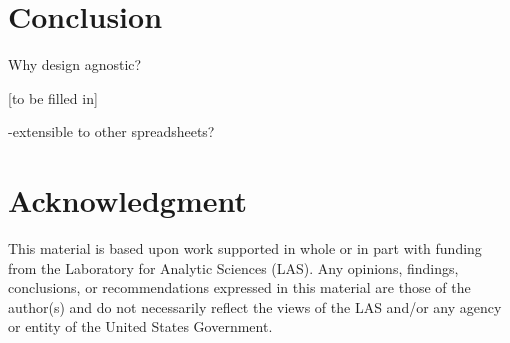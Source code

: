 \documentclass[conference]{IEEEtran}
\begin{document}
	\section{Conclusion} Why design agnostic?
	
	[to be filled in]
	
	-extensible to other spreadsheets? %
	
	
	\section*{Acknowledgment} This material is based upon work supported in whole
	or in part with funding from the Laboratory for Analytic Sciences (LAS). Any
	opinions, findings, conclusions, or recommendations expressed in this material
	are those of the author(s) and do not necessarily reflect the views of the LAS
	and/or any agency or entity of the United States Government.
	
	
	
	
	
	
\end{document}
